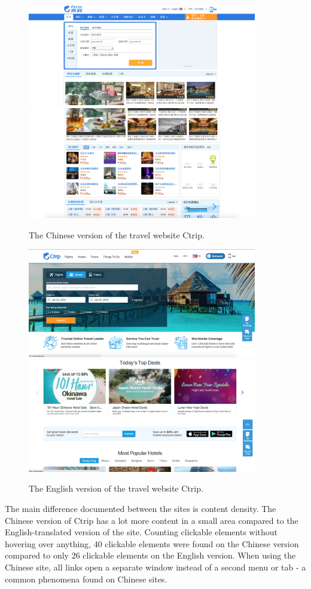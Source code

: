 \begin{figure}[h]
\centering
\includegraphics[width=100mm]{Images/ctrip_chinese1}
\includegraphics[width=100mm]{Images/ctrip_chinese2}
\decoRule
\caption[Chinese version of Ctrip]{The Chinese version of the travel website Ctrip.}
\label{fig:ctrip_chinese}
\end{figure}

\begin{figure}[h]
\centering
\includegraphics[width=100mm]{Images/ctrip_eng1}
\includegraphics[width=100mm]{Images/ctrip_eng2}
\decoRule
\caption[English version of Ctrip]{The English version of the travel website Ctrip.}
\label{fig:ctrip_english}
\end{figure}
 The main difference documented between the sites is content density. The Chinese version of Ctrip has a lot more content in a small area compared to the English-translated version of the site. Counting clickable elements without hovering over anything, 40 clickable elements were found on the Chinese version compared to only 26 clickable elements on the English version. When using the Chinese site, all links open a separate window instead of a second menu or tab - a common phenomena found on Chinese sites.
 
